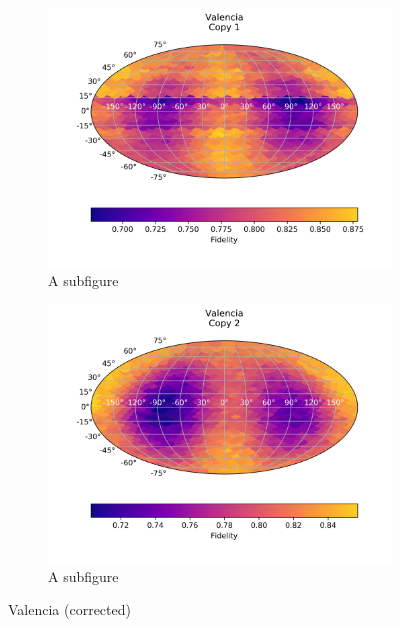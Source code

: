 \begin{figure}[H]
    \centering
    \begin{subfigure}{.5\textwidth}
      \centering
      \includegraphics[width=\textwidth]{Figures/PhaseCovariant/IBM/FullSphere/results_corrected_valencia.txt_copy1.png}
      \caption{A subfigure}
      \label{fig:pc_valencia_sphere_1_corrected}
    \end{subfigure}%
    \begin{subfigure}{.5\textwidth}
      \centering
      \includegraphics[width=\textwidth]{Figures/PhaseCovariant/IBM/FullSphere/results_corrected_valencia.txt_copy2.png}
      \caption{A subfigure}
      \label{fig:pc_valencia_sphere_2_corrected}
    \end{subfigure}
    \caption{Valencia (corrected)}
    \label{fig:pc_valencia_sphere_corrected}
\end{figure}

